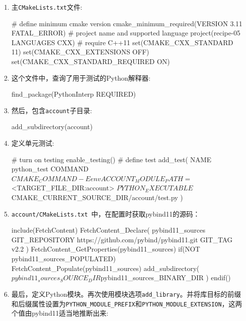 \begin{enumerate}
\item 主\texttt{CMakeLists.txt}文件:

\begin{codebox}[cmake]
# define minimum cmake version
cmake_minimum_required(VERSION 3.11 FATAL_ERROR)
# project name and supported language
project(recipe-05 LANGUAGES CXX)
# require C++11
set(CMAKE_CXX_STANDARD 11)
set(CMAKE_CXX_EXTENSIONS OFF)
set(CMAKE_CXX_STANDARD_REQUIRED ON)
\end{codebox}

\item 这个文件中，查询了用于测试的Python解释器:

\begin{codebox}[cmake]
find_package(PythonInterp REQUIRED)
\end{codebox}

\item 然后，包含\texttt{account}子目录:

\begin{codebox}[cmake]
add_subdirectory(account)
\end{codebox}

\item 定义单元测试:

\begin{codebox}[cmake]
# turn on testing
enable_testing()
# define test
add_test(
  NAME
    python_test
  COMMAND
    ${CMAKE_COMMAND} -E env ACCOUNT_MODULE_PATH=$<TARGET_FILE_DIR:account>
    ${PYTHON_EXECUTABLE} ${CMAKE_CURRENT_SOURCE_DIR}/account/test.py
  )
\end{codebox}

\item \texttt{account/CMakeLists.txt }中，在配置时获取pybind11的源码：

\begin{codebox}[cmake]
include(FetchContent)
FetchContent_Declare(
  pybind11_sources
  GIT_REPOSITORY https://github.com/pybind/pybind11.git
  GIT_TAG v2.2
  )
FetchContent_GetProperties(pybind11_sources)
if(NOT pybind11_sources_POPULATED)
  FetchContent_Populate(pybind11_sources)
  add_subdirectory(
    ${pybind11_sources_SOURCE_DIR}
    ${pybind11_sources_BINARY_DIR}
    )
endif()
\end{codebox}

\item 最后，定义Python模块。再次使用模块选项\texttt{add\_library}。并将库目标的前缀和后缀属性设置为\texttt{PYTHON\_MODULE\_PREFIX}和\texttt{PYTHON\_MODULE\_EXTENSION}，这两个值由pybind11适当地推断出来:


\end{enumerate}
